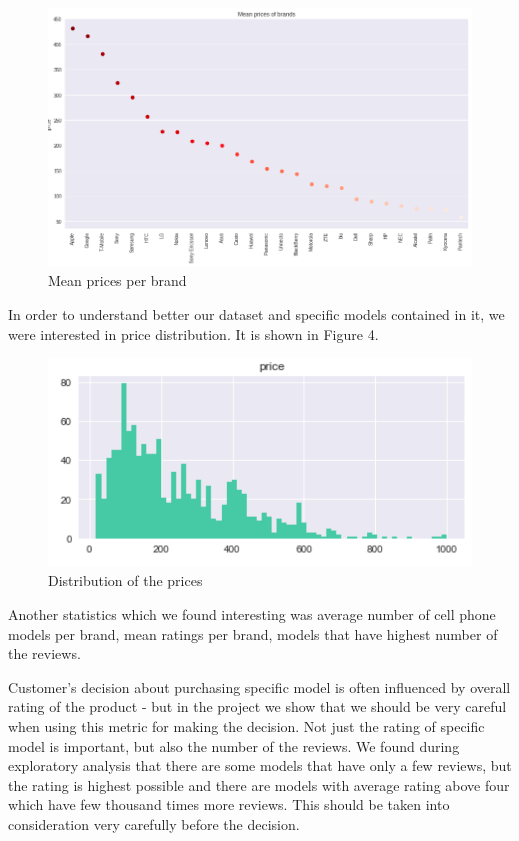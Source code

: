 \documentclass[11pt]{article}
\begin{document}
\begin{figure}[h!]
  \centering
    \includegraphics[width=\linewidth]{meanPrices.png}
  \caption{Mean prices per brand}
  \label{fig:meanPricePerBrand}
\end{figure}

In order to understand better our dataset and specific models contained in it, we were interested in price distribution. It is shown in Figure 4. 

\begin{figure}[h!]
  \centering
    \includegraphics[width=\linewidth]{priceDistribution.png}
  \caption{Distribution of the prices}
  \label{fig:priceDistribution}
\end{figure}

Another statistics which we found interesting was average number of cell phone models per brand, mean ratings per brand, models that have highest number of the reviews. 

Customer's decision about purchasing specific model is often influenced by overall rating of the product - but in the project we show that we should be very careful when using this metric for making the decision. Not just the rating of specific model is important, but also the number of the reviews. We found during exploratory analysis that there are some models that have only a few reviews, but the rating is highest possible and there are models with average rating above four which have few thousand times more reviews. This should be taken into consideration very carefully before the decision. \par\par
\end{document}
